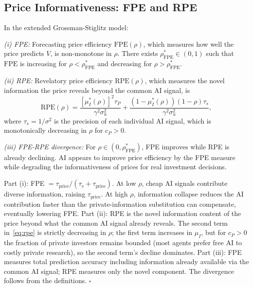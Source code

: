 \subsection{Price Informativeness: FPE and RPE}

\begin{proposition}\label{prop:rpe}
  In the extended Grossman-Stiglitz model:

  \emph{(i) FPE:} Forecasting price efficiency $\mathrm{FPE}(\rho)$, which measures how well the price predicts $V$, is non-monotone in $\rho$. There exists $\rho_{\text{FPE}}^* \in (0,1)$ such that $\mathrm{FPE}$ is increasing for $\rho < \rho_{\text{FPE}}^*$ and decreasing for $\rho > \rho_{\text{FPE}}^*$.

  \emph{(ii) RPE:} Revelatory price efficiency $\mathrm{RPE}(\rho)$, which measures the novel information the price reveals beyond the common AI signal, is
  \begin{equation}\label{eq:rpe}
    \mathrm{RPE}(\rho) = \frac{\left[\mu_I^*(\rho)\right]^2 \tau_P}{\gamma^2 \sigma_u^2} + \frac{(1-\mu_I^*(\rho))(1-\rho)\tau_s}{\gamma^2\sigma_u^2},
  \end{equation}
  where $\tau_s = 1/\sigma^2$ is the precision of each individual AI signal,
  which is monotonically decreasing in $\rho$ for $c_P > 0$.

  \emph{(iii) FPE-RPE divergence:} For $\rho \in (0, \rho_{\text{FPE}}^*)$, FPE improves while RPE is already declining. AI appears to improve price efficiency by the FPE measure while degrading the informativeness of prices for real investment decisions.

   Part (i): FPE $= \tau_{\text{price}}/(\tau_v + \tau_{\text{price}})$. At low $\rho$, cheap AI signals contribute diverse information, raising $\tau_{\text{price}}$. At high $\rho$, information collapse reduces the AI contribution faster than the private-information substitution can compensate, eventually lowering FPE. Part (ii): RPE is the novel information content of the price beyond what the common AI signal already reveals. The second term in~\eqref{eq:rpe} is strictly decreasing in $\rho$; the first term increases in $\mu_I$, but for $c_P > 0$ the fraction of private investors remains bounded (most agents prefer free AI to costly private research), so the second term's decline dominates. Part (iii): FPE measures total prediction accuracy including information already available via the common AI signal; RPE measures only the novel component. The divergence follows from the definitions. $\square$
\end{proposition}

